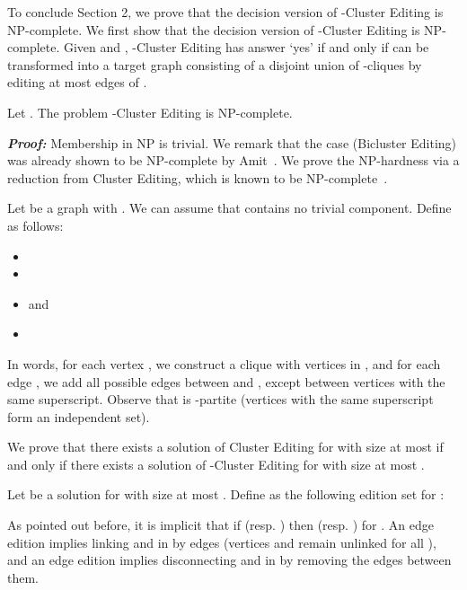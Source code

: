\documentclass[12pt]{article}
\begin{document}
To conclude Section 2, we prove that the decision version of {\sc -Cluster Editing} is NP-complete.
We first show that the decision version of {\sc -Cluster Editing} is NP-complete. Given  and ,
{\sc -Cluster Editing} has answer `yes' if and only if  can be transformed
into a target graph consisting of a disjoint union of -cliques by editing at most  edges of .

\begin{lema} \label{NP-hard L-cluster}
Let . The problem {\sc -Cluster Editing} is NP-complete.
\end{lema}

\noindent
\emph{\textbf{Proof:}}
Membership in NP is trivial. We remark that the case  ({\sc Bicluster Editing})
was already shown to be NP-complete by Amit~\cite{TBGEP2004}.
We prove the NP-hardness via a reduction from {\sc Cluster Editing},
which is known to be NP-complete~\cite{SST2004}.

Let  be a graph with .
We can assume that  contains no trivial component.
Define  as follows:

\begin{itemize}

\item 

\item 

\item  and

\item 

\end{itemize}

In words, for each vertex , we construct a clique  with  vertices in ,
and for each edge , we add all possible edges between  and , except between
vertices with the same superscript. Observe that  is -partite (vertices with the same superscript  form an independent set).

We prove that there exists a solution  of {\sc Cluster Editing} for  with size at most 
if and only if there exists a solution  of {\sc -Cluster Editing} for  with size at most .

Let  be a solution for  with size at most . Define  as the following edition set for :



As pointed out before, it is implicit that if  (resp. ) then  (resp. ) for . An edge edition  implies linking  and  in  by  edges (vertices  and  remain unlinked for all ), and an edge edition  implies disconnecting  and  in  by removing the  edges between them.
\end{document}
